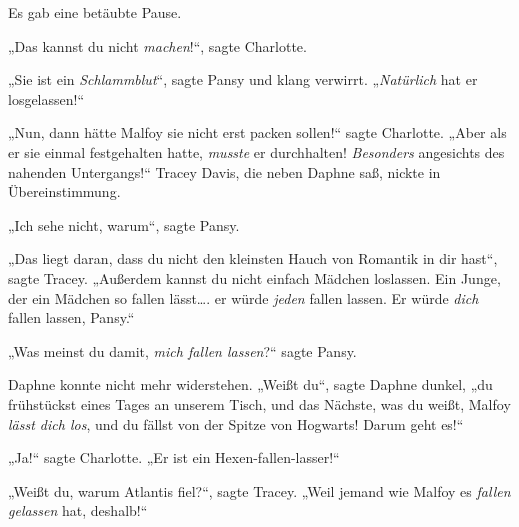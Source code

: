 Es gab eine betäubte Pause.

„Das kannst du nicht \emph{machen}!“, sagte Charlotte.

„Sie ist ein \emph{Schlammblut}“, sagte Pansy und klang verwirrt. „\emph{Natürlich} hat er losgelassen!“

„Nun, dann hätte Malfoy sie nicht erst packen sollen!“ sagte Charlotte. „Aber als er sie einmal festgehalten hatte, \emph{musste} er durchhalten! \emph{Besonders} angesichts des nahenden Untergangs!“ Tracey Davis, die neben Daphne saß, nickte in Übereinstimmung.

„Ich sehe nicht, warum“, sagte Pansy.

„Das liegt daran, dass du nicht den kleinsten Hauch von Romantik in dir hast“, sagte Tracey. „Außerdem kannst du nicht einfach Mädchen loslassen. Ein Junge, der ein Mädchen so fallen lässt…. er würde \emph{jeden} fallen lassen. Er würde \emph{dich} fallen lassen, Pansy.“

„Was meinst du damit, \emph{mich fallen lassen}?“ sagte Pansy.

Daphne konnte nicht mehr widerstehen. „Weißt du“, sagte Daphne dunkel, „du frühstückst eines Tages an unserem Tisch, und das Nächste, was du weißt, Malfoy \emph{lässt dich los}, und du fällst von der Spitze von Hogwarts! Darum geht es!“

„Ja!“ sagte Charlotte. „Er ist ein Hexen-fallen-lasser!“

„Weißt du, warum Atlantis fiel?“, sagte Tracey. „Weil jemand wie Malfoy es \emph{fallen gelassen} hat, deshalb!“

